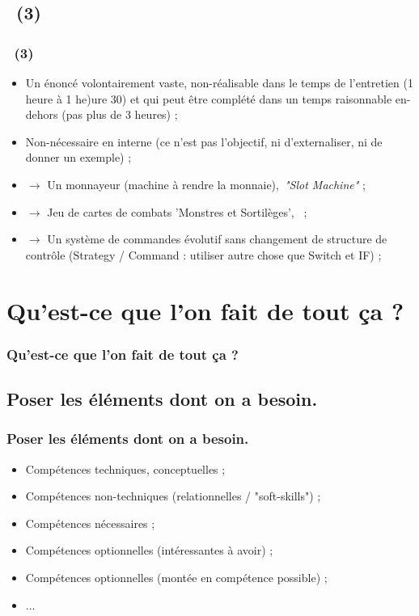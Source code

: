 \documentclass[slidetop,11pt]{beamer}
\begin{document}
\subsection{\titleExemplesCyberFizzBuzz ~(3)}
\begin{frame}
	\frametitle{\titleExemplesCyberFizzBuzz ~(3)}
	\begin{itemize}
		\item Un {\'e}nonc{\'e} volontairement vaste, non-r{\'e}alisable dans le temps de l'entretien (1 heure {\`a} 1 he)ure 30) et qui peut {\^e}tre compl{\'e}t{\'e} dans un temps raisonnable en-dehors (pas plus de 3 heures) ; 
		\item Non-n{\'e}cessaire en interne (ce n'est pas l'objectif, ni d'externaliser, ni de donner un exemple) ; 
		\item $\rightarrow$ Un monnayeur (machine {\`a} rendre la monnaie),~\newline \emph{"Slot Machine"} ;
		\item $\rightarrow$ Jeu de cartes de combats 'Monstres et Sortil{\`e}ges',~ ;
		\item $\rightarrow$ Un syst{\`e}me de commandes {\'e}volutif sans changement de structure de contr{\^o}le (Strategy / Command : utiliser autre chose que Switch et IF) ; 
	\end{itemize}
\end{frame} 

\section{Qu'est-ce que l'on fait de tout \c{c}a ?}
\begin{frame}
	\frametitle{Qu'est-ce que l'on fait de tout \c{c}a ?}
	\tableofcontents[sections=4,currentsection,subsectionstyle=show/shaded/hide] %
\end{frame} 

\subsection{Poser les {\'e}l{\'e}ments dont on a besoin. }
\begin{frame}
	\frametitle{Poser les {\'e}l{\'e}ments dont on a besoin. }
	\begin{itemize}
		\item Comp{\'e}tences techniques, conceptuelles ; 
		\item Comp{\'e}tences non-techniques (relationnelles / "soft-skills") ; 
		\item Comp{\'e}tences n{\'e}cessaires ; 
		\item Comp{\'e}tences optionnelles (int{\'e}ressantes {\`a} avoir) ; 
		\item Comp{\'e}tences optionnelles (mont{\'e}e en comp{\'e}tence possible) ; 
		\item ... 
	\end{itemize}
\end{frame} 
\end{document}

